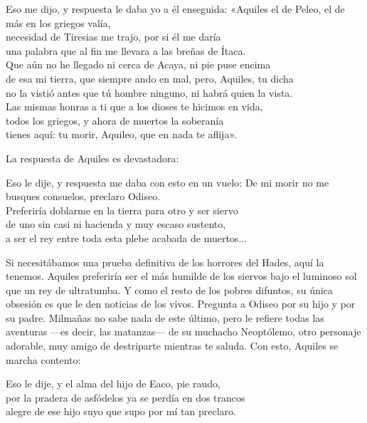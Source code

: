 \begin{versocita}
Eso me dijo, y respuesta le daba yo a él enseguida:
\stanzabreak
«Aquiles el de Peleo, el de más en los griegos valía,\\
necesidad de Tiresias me trajo, por si él me daría\\
una palabra que al fin me llevara a las breñas de Ítaca.\\
Que aún no he llegado ni cerca de Acaya, ni pie puse encima\\
de esa mi tierra, que siempre ando en mal, pero, Aquiles, tu dicha\\
no la vistió antes que tú hombre ninguno, ni habrá quien la vista.\\
Las mismas honras a ti que a los dioses te hicimos en vida,\\
todos los griegos, y ahora de muertos la soberanía\\
tienes aquí: tu morir, Aquileo, que en nada te aflija».
\end{versocita}

La respuesta de Aquiles es devastadora:

\begin{versocita}
Eso le dije, y respuesta me daba con esto en un vuelo:
\stanzabreak
De mi morir no me busques consuelos, preclaro Odiseo.\\
Preferiría doblarme en la tierra para otro y ser siervo\\
de uno sin casi ni hacienda y muy escaso sustento,\\
a ser el rey entre toda esta plebe acabada de muertos...
\end{versocita}

Si necesitábamos una prueba definitiva de los horrores del Hades, aquí la tenemos. Aquiles preferiría ser el más humilde de los siervos bajo el luminoso sol que un rey de ultratumba. Y como el resto de los pobres difuntos, su única obsesión es que le den noticias de los vivos. Pregunta a Odiseo por su hijo y por su padre. Milmañas no sabe nada de este último, pero le refiere todas las aventuras ---es decir, las matanzas--- de su muchacho Neoptólemo, otro personaje adorable, muy amigo de destriparte mientras te saluda. Con esto, Aquiles se marcha contento:

\begin{versocita}
Eso le dije, y el alma del hijo de Eaco, pie raudo,\\
por la pradera de asfódelos ya se perdía en dos trancos\\
alegre de ese hijo suyo que supo por mí tan preclaro.
\end{versocita}

